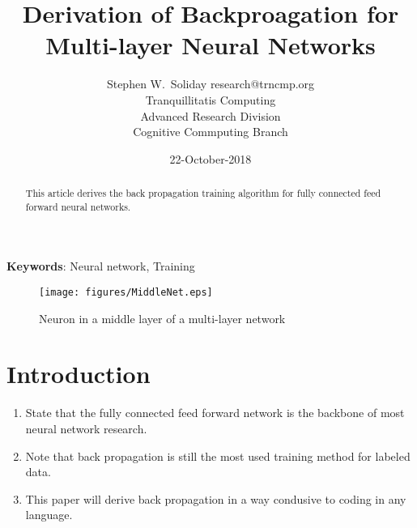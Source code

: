 \documentclass{article}
\begin{document}
\title{Derivation of Backproagation for Multi-layer Neural Networks}
\author{ \name Stephen W.~Soliday \email research@trncmp.org \\
  \addr Tranquillitatis Computing \\
  \addr Advanced Research Division\\
  \addr Cognitive Commputing Branch \\
}
\date{22-October-2018}

\maketitle

\begin{abstract}%

  This article derives the back propagation training algorithm for fully
  connected feed forward neural networks.
  
\end{abstract}

\vspace{12pt}
\textbf{Keywords}: Neural network, Training

\begin{figure}[h]
  \begin{center}
    \texttt{[image: figures/MiddleNet.eps]}
    \caption{Neuron in a middle layer of a multi-layer network}
    \label{fig:midlayer}
  \end{center}
\end{figure}

\section{Introduction\label{sec:intro}}

\begin{enumerate}
  
\item State that the fully connected feed forward network is the
      backbone of most neural network research.
\item Note that back propagation is still the most used training
      method for labeled data.
\item This paper will derive back propagation in a way condusive
      to coding in any language.
\end{enumerate}
\end{document}
